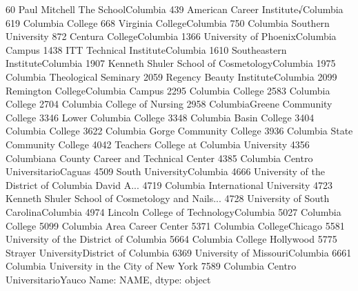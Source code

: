 \documentclass[letterpaper,10pt,english]{sphinxmanual}
\begin{document}
\begin{sphinxVerbatim}[commandchars=\\\{\}]
60                      Paul Mitchell The School\PYGZhy{}Columbia
439                    American Career Institute√Columbia
619                                      Columbia College
668                             Virginia College\PYGZhy{}Columbia
750                          Columbia Southern University
872                              Centura College\PYGZhy{}Columbia
1366                University of Phoenix\PYGZhy{}Columbia Campus
1438                     ITT Technical Institute\PYGZhy{}Columbia
1610                      Southeastern Institute\PYGZhy{}Columbia
1907        Kenneth Shuler School of Cosmetology\PYGZhy{}Columbia
1975                        Columbia Theological Seminary
2059                    Regency Beauty Institute\PYGZhy{}Columbia
2099                    Remington College\PYGZhy{}Columbia Campus
2295                                     Columbia College
2583                                     Columbia College
2704                          Columbia College of Nursing
2958                    Columbia\PYGZhy{}Greene Community College
3346                               Lower Columbia College
3348                               Columbia Basin College
3404                                     Columbia College
3622                     Columbia Gorge Community College
3936                     Columbia State Community College
4042              Teachers College at Columbia University
4356        Columbiana County Career and Technical Center
4385                 Columbia Centro Universitario\PYGZhy{}Caguas
4509                            South University\PYGZhy{}Columbia
4666    University of the District of Columbia David A...
4719                    Columbia International University
4723    Kenneth Shuler School of Cosmetology and Nails...
4728                University of South Carolina\PYGZhy{}Columbia
4974               Lincoln College of Technology\PYGZhy{}Columbia
5027                                     Columbia College
5099                          Columbia Area Career Center
5371                             Columbia College\PYGZhy{}Chicago
5581               University of the District of Columbia
5664                           Columbia College Hollywood
5775              Strayer University\PYGZhy{}District of Columbia
6369                      University of Missouri\PYGZhy{}Columbia
6661          Columbia University in the City of New York
7589                  Columbia Centro Universitario\PYGZhy{}Yauco
Name: NAME, dtype: object
\end{sphinxVerbatim}
\end{document}
